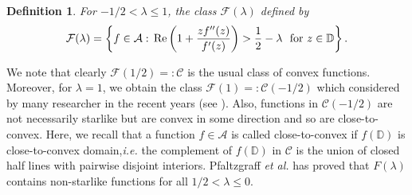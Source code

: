 \documentclass[a4paper,12pt]{amsart}
\newtheorem{definition}[theorem]{Definition}
\theoremstyle{definition}
\numberwithin{equation}{section}
\begin{document}
\begin{definition}
For $-1/2< \lambda\le 1$, the class $\mathcal{F}(\lambda)$ defined  by 
\begin{equation*}
	\mathcal{F}(\lambda)=\left\{f\in \mathcal{A}:\,	{\rm Re}\left(1+\frac{zf''(z)}{f'(z)}\right)>\frac{1}{2} -\lambda ~\mbox{ for $z \in \mathbb{D}$}\right\}.
\end{equation*}
\end{definition}
\noindent We note that clearly $\mathcal{F}(1/2)=:\mathcal{C}$ is the usual class of convex functions. Moreover, for $\lambda=1$, we obtain the class $\mathcal{F}(1)=:\mathcal{C}(-1/2)$ which considered by many researcher in the recent years (see \cite{AV19,Vibhuti,Obradovic15, PSY14}). Also, functions in $\mathcal{C} (-1/2)$ are not necessarily starlike but are convex in some direction and so are close-to-convex. Here, we recall that
a function $f \in \mathcal{A}$ is called close-to-convex if $f(\mathbb{D})$ is close-to-convex domain,{\em  i.e.} the complement of $f(\mathbb{D})$ in $\mathcal{C}$ is the union of closed half lines with pairwise disjoint
interiors. Pfaltzgraff {\it et al.} \cite{pft}  has proved that $F(\lambda)$  
contains non-starlike functions for all $ 1/2 < \lambda \leq 0$. \\
\end{document}
